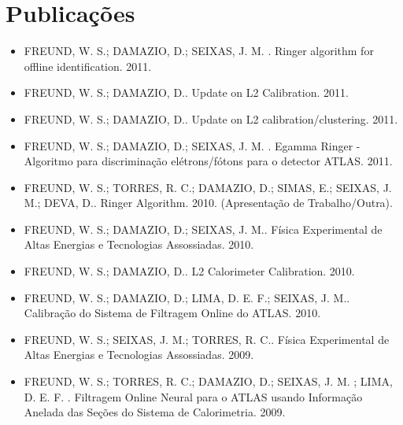 \chapter{Publicações}

\begin{itemize}

\item  FREUND, W. S.; DAMAZIO, D.; SEIXAS, J. M. . Ringer algorithm for offline
identification. 2011.

\item  FREUND, W. S.; DAMAZIO, D.. Update on L2 Calibration. 2011. 

\item  FREUND, W. S.; DAMAZIO, D.. Update on L2 calibration/clustering. 2011.

\item  FREUND, W. S.; DAMAZIO, D.; SEIXAS, J. M. . Egamma Ringer - Algoritmo para
discriminação elétrons/fótons para o detector ATLAS. 2011. 

\item   FREUND, W. S.; TORRES, R. C.; DAMAZIO, D.; SIMAS, E.; SEIXAS, J. M.;
DEVA, D.. Ringer Algorithm. 2010. (Apresentação de Trabalho/Outra).

\item FREUND, W. S.; DAMAZIO, D.; SEIXAS, J. M.. Física Experimental de Altas
Energias e Tecnologias Assossiadas. 2010.

\item FREUND, W. S.; DAMAZIO, D.. L2 Calorimeter Calibration. 2010.


\item FREUND, W. S.; DAMAZIO, D.; LIMA, D. E. F.; SEIXAS, J. M.. Calibração do
Sistema de Filtragem Online do ATLAS. 2010. 

\item FREUND, W. S.; SEIXAS, J. M.; TORRES, R. C.. Física Experimental de Altas
Energias e Tecnologias Assossiadas. 2009.

\item FREUND, W. S.; TORRES, R. C.; DAMAZIO, D.; SEIXAS, J. M. ; LIMA, D. E. F.
. Filtragem Online Neural para o ATLAS usando Informação Anelada das Seções do
Sistema de Calorimetria. 2009.


\end{itemize}
